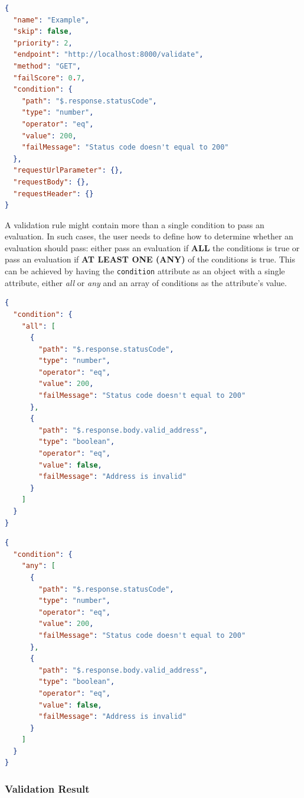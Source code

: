     \newpage
    \begin{lstlisting}[caption={Validation rule example (JSON)}, language=json]
{
  "name": "Example",
  "skip": false,
  "priority": 2,
  "endpoint": "http://localhost:8000/validate",
  "method": "GET",
  "failScore": 0.7,
  "condition": {
    "path": "$.response.statusCode",
    "type": "number",
    "operator": "eq",
    "value": 200,
    "failMessage": "Status code doesn't equal to 200"
  },
  "requestUrlParameter": {},
  "requestBody": {},
  "requestHeader": {}
}
    \end{lstlisting}

    A validation rule might contain more than a single condition to pass an evaluation. In such cases, the user needs to define how to determine whether an evaluation should pass: either pass an evaluation if \textbf{ALL} the conditions is true or pass an evaluation if \textbf{AT LEAST ONE (ANY)} of the conditions is true. This can be achieved by having the \verb;condition; attribute as an object with a single attribute, either \emph{all} or \emph{any} and an array of conditions as the attribute's value.

    \begin{lstlisting}[caption={Validation rule \textbf{condition} attribute example with ALL condition (JSON)}, language=json]
{
  "condition": {
    "all": [
      {
        "path": "$.response.statusCode",
        "type": "number",
        "operator": "eq",
        "value": 200,
        "failMessage": "Status code doesn't equal to 200"
      },
      {
        "path": "$.response.body.valid_address",
        "type": "boolean",
        "operator": "eq",
        "value": false,
        "failMessage": "Address is invalid"
      }
    ]
  }
}
\end{lstlisting}

    \begin{lstlisting}[caption={Validation rule \textbf{condition} attribute example with ANY condition (JSON)}, language=json]
{
  "condition": {
    "any": [
      {
        "path": "$.response.statusCode",
        "type": "number",
        "operator": "eq",
        "value": 200,
        "failMessage": "Status code doesn't equal to 200"
      },
      {
        "path": "$.response.body.valid_address",
        "type": "boolean",
        "operator": "eq",
        "value": false,
        "failMessage": "Address is invalid"
      }
    ]
  }
}
    \end{lstlisting}

  \subsubsection{Validation Result}

